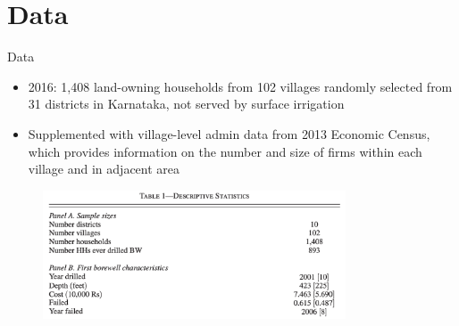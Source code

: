 \documentclass[10pt]{beamer}
\begin{document}
\section{Data}
\begin{frame}
	{Data}
	\begin{itemize}
		\item 2016: 1,408 land-owning households from 102 villages randomly selected from 31 districts in Karnataka, not served by surface irrigation
		\item Supplemented with village-level admin data from 2013 Economic Census, which provides information on the number and size of firms within each village and in adjacent area
	\end{itemize}
	\begin{figure}
		\centering
		\includegraphics[width=0.8\textwidth]{table1_ab.png}
	\end{figure}
\end{frame}
\end{document}
